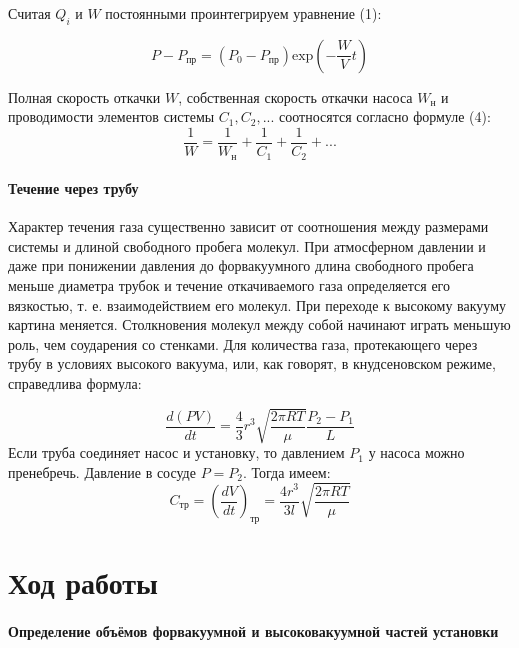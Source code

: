 \documentclass[a4paper,12pt]{article}
\begin{document}
Считая $Q_i$ и $W$ постоянными проинтегрируем уравнение (1):

\begin{equation}
    P-P_\text{пр}=(P_0-P_\text{пр})\text{exp}(-\frac{W}{V}t)
\end{equation}

Полная скорость откачки $W$, собственная скорость откачки насоса $W_{\text{н}}$ и проводимости элементов системы $C_1, C_2,...$ соотносятся согласно формуле (4):
\begin{equation}
    \frac{1}{W}=\frac{1}{W_\text{н}}+\frac{1}{C_1}+\frac{1}{C_2}+...
\end{equation}

\paragraph{Течение через трубу}
Характер течения газа существенно зависит от соотношения между размерами системы и длиной свободного
пробега молекул. При атмосферном давлении и даже при понижении
давления до форвакуумного длина свободного пробега меньше диаметра трубок и течение откачиваемого газа определяется его вязкостью,
т. е. взаимодействием его молекул. При переходе к высокому вакууму
картина меняется. Столкновения молекул между собой начинают играть меньшую роль, чем соударения со стенками.
Для количества газа, протекающего через трубу в условиях высокого вакуума, или, как говорят, в кнудсеновском режиме, справедлива формула:

\begin{equation}
    \frac{d(PV)}{dt}=\frac{4}{3}r^{3}\sqrt{\frac{2\pi RT}{\mu}}\frac{P_2-P_1}{L}
\end{equation}
Если труба соединяет насос и установку, то давлением $P_1$ у насоса можно пренебречь. Давление в сосуде $P = P_2$. Тогда имеем:
\begin{equation}
C_\text{тр} = \left(\frac{dV}{dt}\right)_\text{тр} = \frac{4r^3}{3l}\sqrt{\frac{2\pi RT}{\mu}}
\end{equation}
\newpage

\section*{Ход работы}

\paragraph{Определение объёмов форвакуумной и высоковакуумной частей установки}
\end{document}
